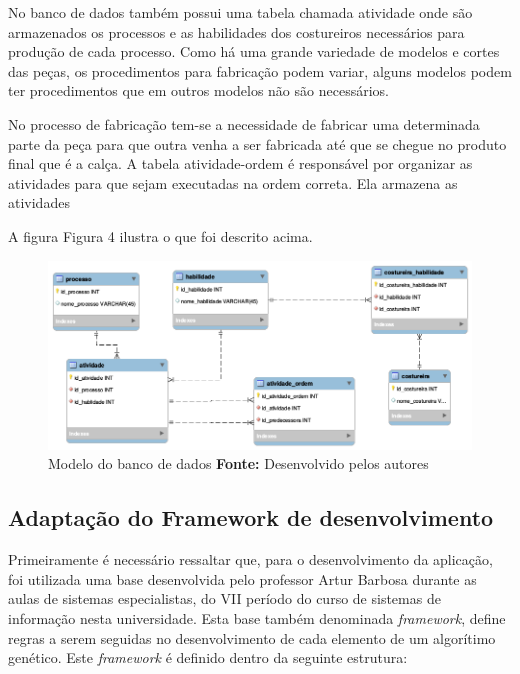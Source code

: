 \par No banco de dados também possui uma tabela chamada atividade onde são
armazenados os processos e as habilidades dos costureiros necessários para
produção de cada processo.
Como há uma grande variedade de modelos e cortes das peças, os procedimentos
para fabricação podem variar, alguns modelos podem ter procedimentos que em outros
modelos não são necessários.

\par No processo de fabricação tem-se a necessidade de fabricar uma
determinada parte da peça para que outra venha a ser fabricada até que se chegue
no produto final que é a calça. A tabela atividade-ordem é responsável por
organizar as atividades para que sejam executadas na ordem correta. Ela
armazena as atividades 

\par A figura Figura 4 ilustra o que foi descrito acima.

\begin{figure}[h!]
	\centerline{\includegraphics[scale=0.6]{./imagens/model_tcc.png}}
	\caption[Modelo do banco de dados]
	{Modelo do banco de dados \textbf{Fonte:} Desenvolvido pelos autores}
	\label{fig:exemplo1}
\end{figure}

\subsection{Adaptação do Framework de desenvolvimento}
\par Primeiramente é necessário ressaltar que, para o desenvolvimento da aplicação, foi utilizada uma base desenvolvida pelo professor Artur Barbosa durante as aulas de sistemas especialistas, do VII período do curso de sistemas de informação nesta universidade.
Esta base também denominada \textit{framework}, define regras a serem seguidas no desenvolvimento de cada elemento
de um algorítimo genético. Este \textit{framework} é definido dentro da seguinte estrutura:

